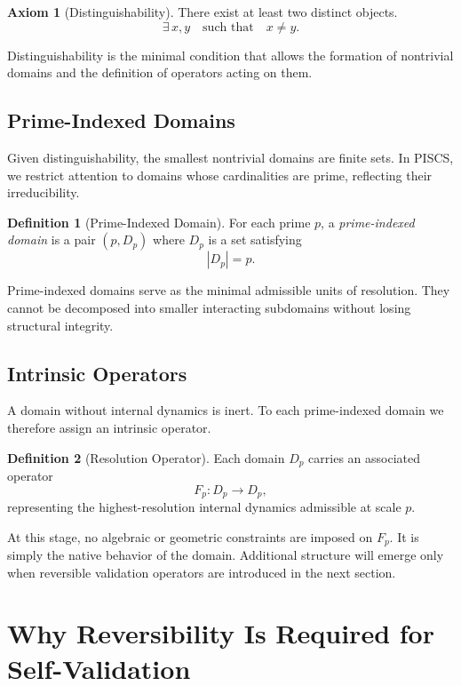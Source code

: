 \documentclass[11pt]{article}
\theoremstyle{definition}
\newtheorem{definition}{Definition}[section]
\newtheorem{axiom}{Axiom}[section]
\theoremstyle{plain}
\theoremstyle{remark}
\begin{document}
\begin{axiom}[Distinguishability]
There exist at least two distinct objects.
\[
\exists\, x,y \quad \text{such that} \quad x \neq y.
\]
\end{axiom}

Distinguishability is the minimal condition that allows the formation of
nontrivial domains and the definition of operators acting on them.

\subsection{Prime-Indexed Domains}

Given distinguishability, the smallest nontrivial domains are finite
sets. In PISCS, we restrict attention to domains whose cardinalities are
prime, reflecting their irreducibility.

\begin{definition}[Prime-Indexed Domain]
For each prime $p$, a \emph{prime-indexed domain} is a pair $(p, D_p)$
where $D_p$ is a set satisfying
\[
|D_p| = p.
\]
\end{definition}

Prime-indexed domains serve as the minimal admissible units of
resolution. They cannot be decomposed into smaller interacting
subdomains without losing structural integrity.

\subsection{Intrinsic Operators}

A domain without internal dynamics is inert. To each prime-indexed
domain we therefore assign an intrinsic operator.

\begin{definition}[Resolution Operator]
Each domain $D_p$ carries an associated operator
\[
F_p : D_p \to D_p,
\]
representing the highest-resolution internal dynamics admissible at
scale $p$.
\end{definition}

At this stage, no algebraic or geometric constraints are imposed on
$F_p$. It is simply the native behavior of the domain. Additional
structure will emerge only when reversible validation operators are
introduced in the next section.

\section{Why Reversibility Is Required for Self-Validation}
\end{document}
